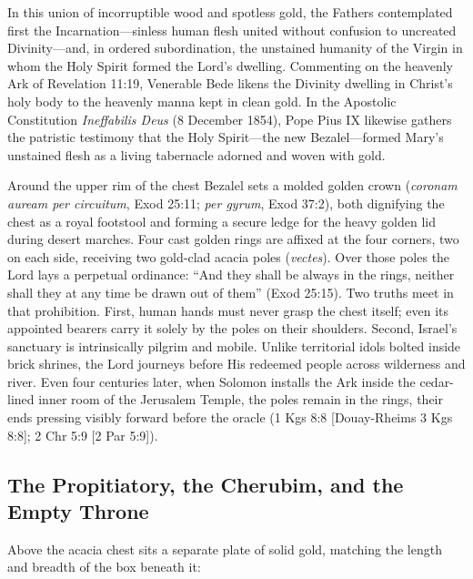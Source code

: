 In this union of incorruptible wood and spotless gold, the Fathers contemplated first the Incarnation---sinless human flesh united without confusion to uncreated Divinity---and, in ordered subordination, the unstained humanity of the Virgin in whom the Holy Spirit formed the Lord's dwelling. Commenting on the heavenly Ark of Revelation 11:19, Venerable Bede likens the Divinity dwelling in Christ's holy body to the heavenly manna kept in clean gold. In the Apostolic Constitution \textit{Ineffabilis Deus} (8 December 1854), Pope Pius IX likewise gathers the patristic testimony that the Holy Spirit---the new Bezalel---formed Mary's unstained flesh as a living tabernacle adorned and woven with gold.

Around the upper rim of the chest Bezalel sets a molded golden crown (\textit{coronam auream per circuitum}, Exod 25:11; \textit{per gyrum}, Exod 37:2), both dignifying the chest as a royal footstool and forming a secure ledge for the heavy golden lid during desert marches. Four cast golden rings are affixed at the four corners, two on each side, receiving two gold-clad acacia poles (\textit{vectes}). Over those poles the Lord lays a perpetual ordinance: ``And they shall be always in the rings, neither shall they at any time be drawn out of them'' (Exod 25:15). Two truths meet in that prohibition. First, human hands must never grasp the chest itself; even its appointed bearers carry it solely by the poles on their shoulders. Second, Israel's sanctuary is intrinsically pilgrim and mobile. Unlike territorial idols bolted inside brick shrines, the Lord journeys before His redeemed people across wilderness and river. Even four centuries later, when Solomon installs the Ark inside the cedar-lined inner room of the Jerusalem Temple, the poles remain in the rings, their ends pressing visibly forward before the oracle (1 Kgs 8:8 [Douay-Rheims 3 Kgs 8:8]; 2 Chr 5:9 [2 Par 5:9]).

\subsection{The Propitiatory, the Cherubim, and the Empty Throne}
\label{subsec:propitiatory-cherubim}

Above the acacia chest sits a separate plate of solid gold, matching the length and breadth of the box beneath it:

